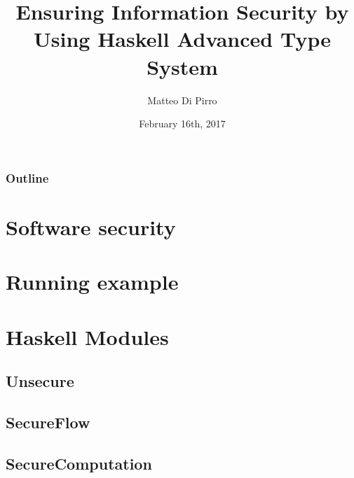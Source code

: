 \documentclass{beamer}
\title{Ensuring Information Security \newline by Using Haskell Advanced Type System}
\subtitle{}
\author{Matteo Di Pirro}
\date{February 16th, 2017}
\institute{University of Padova}
\begin{document}
\newcommand{\turnOffNumbers}{true} %

\begin{frame}[noframenumbering]
\titlepage
\end{frame}

\let\turnOffNumbers\empty
\begin{frame}
	\frametitle{Outline}
	\tableofcontents
\end{frame}

\section{Software security}


\section{Running example}


\section{Haskell Modules}
	\subsection{Unsecure}
	
	\subsection{SecureFlow}
	
	\subsection{SecureComputation}
	
	
\appendix
\makethanks
\renewcommand{\turnOffNumbers}{true} %
\end{document}

